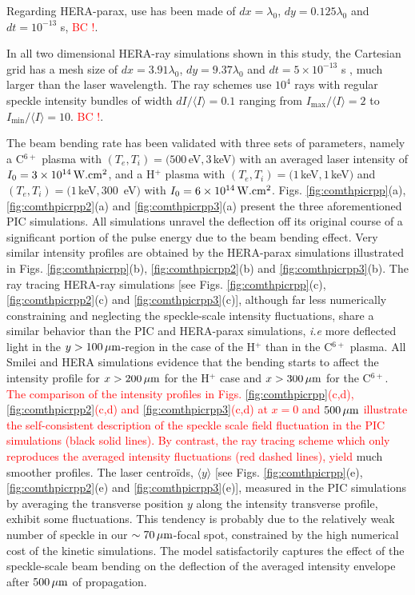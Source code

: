 \documentclass[%
 reprint,
 amsmath,amssymb,
 aps,
]{revtex4-1}
\begin{document}
Regarding HERA-parax, use has been made of $dx =\lambda_0$, $dy = 0.125\lambda_0$ and $dt=10^{-13}$ s, \textcolor{red}{BC !}. 

In all two dimensional HERA-ray simulations shown in this study, the Cartesian grid has a mesh size of $dx=3.91\lambda_0$, $dy=9.37\lambda_0$ and $dt=5\times 10^{-13}$ s , much larger than the laser wavelength. The ray schemes use $10^4$ rays with regular speckle intensity bundles of width $dI/\langle I \rangle=0.1$ ranging from $I_\mathrm{max}/\langle I \rangle=2$ to $I_\mathrm{min}/\langle I \rangle=10$. \textcolor{red}{BC !}. 

The beam bending rate has been validated with three sets of parameters, namely a C$^{6+}$ plasma with $(T_e, T_i )= (500\, $eV$, 3\, $keV$)$ with an averaged laser intensity of $I_0 = 3\times 10^{14}\,\rm W.cm^{2}$, and a H$^{+}$ plasma  with $(T_e, T_i )= (1\, $keV$, 1 \,$keV$)$ and $(T_e, T_i )= (1\, $keV$, 300 \,$ eV$)$ with $I_0 = 6 \times 10^{14}\,\rm W.cm^{2}$.
Figs. \ref{fig:comthpicrpp}(a), \ref{fig:comthpicrpp2}(a) and \ref{fig:comthpicrpp3}(a) present the three aforementioned PIC simulations. All simulations unravel the deflection off its original course of a significant portion of the pulse energy  due to the beam bending effect.  
Very similar intensity profiles are obtained by the HERA-parax simulations illustrated in Figs. \ref{fig:comthpicrpp}(b), \ref{fig:comthpicrpp2}(b) and \ref{fig:comthpicrpp3}(b).
The ray tracing HERA-ray simulations [see Figs. \ref{fig:comthpicrpp}(c), \ref{fig:comthpicrpp2}(c) and \ref{fig:comthpicrpp3}(c)], although far less numerically constraining and neglecting the speckle-scale intensity fluctuations,   share a similar behavior than the PIC and HERA-parax simulations, \emph{i.e} more deflected light in the $y>100\,\rm\mu m$-region in the case of the H$^{+}$ than in the C$^{6+}$ plasma. 
All Smilei and HERA simulations evidence that the bending starts to affect the intensity profile for $x>200\,\rm\mu m$ for the H$^{+}$ case and  $x>300\,\rm\mu m$ for the C$^{6+}$.
\textcolor{red}{
The comparison of the intensity profiles  in Figs. \ref{fig:comthpicrpp}(c,d), \ref{fig:comthpicrpp2}(c,d) and \ref{fig:comthpicrpp3}(c,d) at $x=0$ and $500\,\rm\mu m$ illustrate the self-consistent description of the speckle scale field fluctuation in the PIC simulations (black solid lines). By contrast, the ray tracing scheme which only reproduces the averaged intensity fluctuations (red dashed lines), yield} much smoother profiles.
The laser centro\"ids, $\langle y \rangle$ [see Figs. \ref{fig:comthpicrpp}(e), \ref{fig:comthpicrpp2}(e) and \ref{fig:comthpicrpp3}(e)], measured in the PIC simulations by averaging the transverse position $y$ along the intensity transverse profile, exhibit some fluctuations. This tendency is probably due to the relatively weak number of speckle in our $\sim 70\,\rm\mu m$-focal spot, constrained by the high numerical cost of the kinetic simulations. 
The model satisfactorily captures the effect of the speckle-scale beam bending on the deflection of the averaged intensity envelope after $500\,\rm\mu m$ of propagation. 
\end{document}
